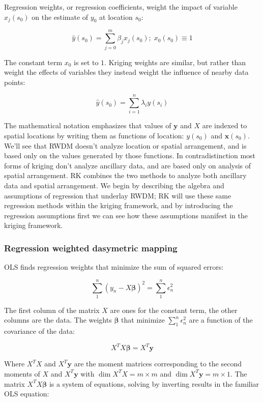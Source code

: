 \documentclass[]{interact}
\theoremstyle{plain}%
\theoremstyle{definition}
\theoremstyle{remark}
\begin{document}
Regression weights, or regression coefficients, weight the impact of variable $x_j(s_0)$ on the estimate of $y_0$ at location $s_0$:

\[\hat{y}(s_0) = \sum_{j=0}^m \beta_j x_j(s_0); \; x_0(s_0) \equiv 1\]

The constant term $x_0$ is set to $1$.  Kriging weights are similar, but rather than weight the effects of variables they instead weight the influence of nearby data points:

\[\hat{y}(s_0) = \sum_{i=1}^n \lambda_i y(s_i)\] %

The mathematical notation emphasizes that values of $\bm{y}$ and $X$ are indexed to spatial locations by writing them as functions of location: $y(s_0)$ and $\bm{x}(s_0)$.  We'll see that RWDM doesn't analyze location or spatial arrangement, and is based only on the values generated by those functions.  In contradistinction most forms of kriging don't analyze ancillary data, and are based only on analysis of spatial arrangement.  RK combines the two methods to analyze both ancillary data and spatial arrangement.  We begin by describing the algebra and assumptions of regression that underlay RWDM; RK will use these same regression methods within the kriging framework, and by introducing the regression assumptions first we can see how these assumptions manifest in the kriging framework.


\subsubsection{Regression weighted dasymetric mapping}

OLS finds regression weights that minimize the sum of squared errors:

\[\sum_1^n (y_n - X \bm{\beta})^2 = \sum_1^n \epsilon_{n}^2 \]

The first column of the matrix $X$ are ones for the constant term, the other columns are the data.  The weights $\bm{\beta}$ that minimize $\sum_1^n \epsilon_{n}^2$ are a function of the covariance of the data:

\[X^T X \bm{\beta} = X^T \bm{y} \]

Where $X^TX$ and $X^T\bm{y}$ are the moment matrices corresponding to the second moments of $X$ and $X^T\bm{y}$ with $\dim{X^TX}=m \times m$ and $\dim{X^T\bm{y}}=m \times 1$.  The matrix $X^T X \bm{\beta}$ is a system of equations, solving by inverting results in the familiar OLS equation:
\end{document}

